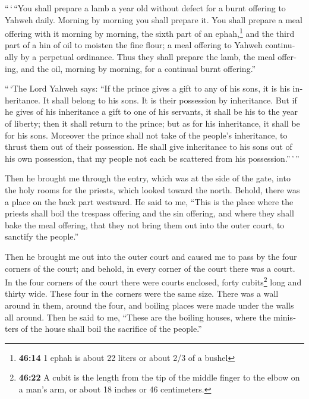 \begin{paracol}{2}
\begin{otherlanguage}{english}
 ``\,`\,``You shall prepare a lamb a year old without
defect for a burnt offering to Yahweh daily. Morning by morning you
shall prepare it.  You shall prepare a meal offering with
it morning by morning, the sixth part of an ephah,\footnote{\textbf{46:14}
  1 ephah is about 22 liters or about 2/3 of a bushel} and the third
part of a hin of oil to moisten the fine flour; a meal offering to
Yahweh continually by a perpetual ordinance.  Thus they
shall prepare the lamb, the meal offering, and the oil, morning by
morning, for a continual burnt offering.''

 ``\,`The Lord Yahweh says: ``If the prince gives a gift
to any of his sons, it is his inheritance. It shall belong to his sons.
It is their possession by inheritance.  But if he gives
of his inheritance a gift to one of his servants, it shall be his to the
year of liberty; then it shall return to the prince; but as for his
inheritance, it shall be for his sons.  Moreover the
prince shall not take of the people's inheritance, to thrust them out of
their possession. He shall give inheritance to his sons out of his own
possession, that my people not each be scattered from his
possession.''\,'\,''

 Then he brought me through the entry, which was at the
side of the gate, into the holy rooms for the priests, which looked
toward the north. Behold, there was a place on the back part westward.
 He said to me, ``This is the place where the priests
shall boil the trespass offering and the sin offering, and where they
shall bake the meal offering, that they not bring them out into the
outer court, to sanctify the people.''

 Then he brought me out into the outer court and caused
me to pass by the four corners of the court; and behold, in every corner
of the court there was a court.  In the four corners of
the court there were courts enclosed, forty cubits\footnote{\textbf{46:22}
  A cubit is the length from the tip of the middle finger to the elbow
  on a man's arm, or about 18 inches or 46 centimeters.} long and thirty
wide. These four in the corners were the same size. 
There was a wall around in them, around the four, and boiling places
were made under the walls all around.  Then he said to
me, ``These are the boiling houses, where the ministers of the house
shall boil the sacrifice of the people.''


\end{otherlanguage}
\end{paracol}

